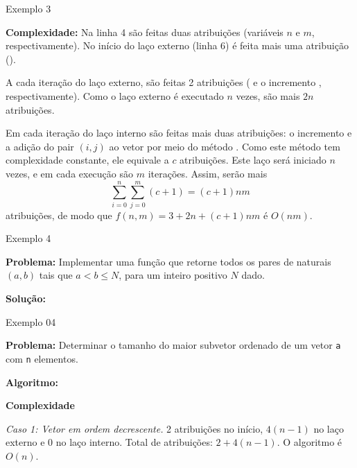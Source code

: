 \begin{frame}[fragile]{Exemplo 3}

    {\bf Complexidade: } Na linha 4 são feitas duas atribuições (variáveis $n$ e $m$, 
        respectivamente). No início do laço externo (linha 6) é feita mais uma atribuição
        ().

        A cada iteração do laço externo, são feitas 2 atribuições ( e o 
        incremento , respectivamente). Como o laço externo é executado $n$ vezes, 
        são mais $2n$ atribuições.

        Em cada iteração do laço interno são feitas mais duas atribuições: o incremento 
         e a adição do pair $(i, j)$ ao vetor  por meio do método
        . Como este método tem complexidade constante, ele equivale a 
        $c$ atribuições. Este laço será iniciado $n$ vezes, e em cada execução são $m$ iterações.
        Assim, serão mais
        \[
            \sum_{i = 0}^n\sum_{j = 0}^m (c + 1) = (c + 1)nm
        \]
        atribuições, de modo que $f(n, m) = 3 + 2n + (c + 1)nm$ é $O(nm)$.
\end{frame}

\begin{frame}[fragile]{Exemplo 4}

    {\bf Problema:} Implementar uma função que retorne todos os pares de naturais $(a, b)$ tais
        que $a < b \leq N$, para um inteiro positivo $N$ dado.
	\vspace{0.1in}

    {\bf Solução:} 
    \vspace{0.2in}

\end{frame}

\begin{frame}[fragile]{Exemplo 04}

	{\bf Problema:} Determinar o tamanho do maior subvetor ordenado de um 
	vetor \texttt{a} com \texttt{n} elementos.
	\vspace{0.1in}

    {\bf Algoritmo:} 
    \vspace{0.2in}
    
	{\bf Complexidade } 

    {\it Caso 1: Vetor em ordem decrescente.} 
    2 atribuições no início, $4(n-1)$ no laço externo e $0$ no laço 
    interno. {Total de atribuições:} $2 + 4(n-1)$.  O algoritmo é $O(n)$.

\end{frame}

